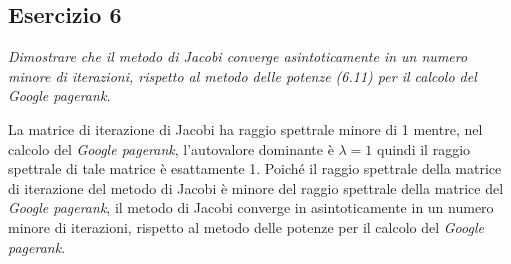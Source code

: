 \subsection{Esercizio 6}
\label{sub:es6}
\emph{Dimostrare che il metodo di Jacobi converge asintoticamente in un numero minore di iterazioni, rispetto al metodo delle potenze (6.11) per il calcolo del \textit{Google pagerank}.}
\begin{sol}
  La matrice di iterazione di Jacobi ha raggio spettrale minore di 1 mentre, nel calcolo del \textsl{Google pagerank},
   l'autovalore dominante è $\lambda=1$ quindi il raggio spettrale di tale matrice è esattamente 1.
   Poiché il raggio spettrale della matrice di iterazione del metodo di Jacobi è minore del raggio spettrale della matrice del
   \textsl{Google pagerank}, il metodo di Jacobi converge in asintoticamente in un numero minore di iterazioni, rispetto al metodo delle potenze per il calcolo del \textsl{Google pagerank}.
\end{sol}

